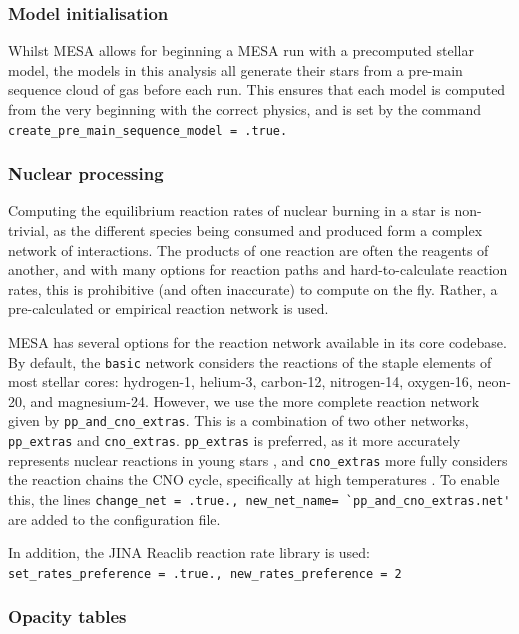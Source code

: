 \subsubsection{Model initialisation}

Whilst MESA allows for beginning a MESA run with a precomputed stellar model, the models in this analysis all generate their stars from a pre-main sequence cloud of gas before each run. This ensures that each model is computed from the very beginning with the correct physics, and is set by the command \lstinline{create_pre_main_sequence_model = .true.}


\subsubsection{Nuclear processing}

Computing the equilibrium reaction rates of nuclear burning in a star is non-trivial, as the different species being consumed and produced form a complex network of interactions.
The products of one reaction are often the reagents of another, and with many options for reaction paths and hard-to-calculate reaction rates, this is prohibitive (and often inaccurate) to compute on the fly. Rather, a pre-calculated or empirical reaction network is used.

MESA has several options for the reaction network available in its core codebase. By default, the \lstinline{basic} network considers the reactions of the staple elements of most stellar cores: hydrogen-1, helium-3, carbon-12, nitrogen-14, oxygen-16, neon-20, and magnesium-24.
However, we use the more complete reaction network given by \lstinline{pp_and_cno_extras}. This is a combination of two other networks, \lstinline{pp_extras} and \lstinline{cno_extras}.
\lstinline{pp_extras} is preferred, as it more accurately represents nuclear reactions in young stars \citep{murphy2021}, and \lstinline{cno_extras} more fully considers the reaction chains the CNO cycle, specifically at high temperatures \citep{paxton2011}. To enable this, the lines \lstinline{change_net = .true., new_net_name= `pp_and_cno_extras.net'} are added to the configuration file.

In addition, the JINA Reaclib reaction rate library \citep{cyburt2010} is used: \lstinline{set_rates_preference = .true., new_rates_preference = 2}


\subsubsection{Opacity tables}

